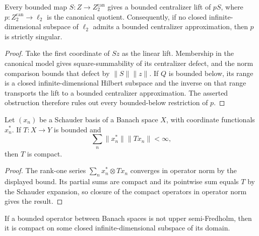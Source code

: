 \begin{lemma}
\label{lem:canonical-quotient-strictly-singular-reduction}
Every bounded map $S:Z\to Z_2^{\mathrm{can}}$ gives a bounded centralizer lift of $pS$, where
$p:Z_2^{\mathrm{can}}\to\ell_2$ is the canonical quotient.  Consequently, if no closed
infinite-dimensional subspace of $\ell_2$ admits a bounded centralizer approximation, then $p$
is strictly singular.
\leanok
\end{lemma}

\begin{proof}
Take the first coordinate of $Sz$ as the linear lift.  Membership in the canonical model gives
square-summability of its centralizer defect, and the norm comparison bounds that defect by
$\lVert S\rVert\lVert z\rVert$.  If $Q$ is bounded below, its range is a closed
infinite-dimensional Hilbert subspace and the inverse on that range transports the lift to a
bounded centralizer approximation.  The asserted obstruction therefore rules out every
bounded-below restriction of $p$.
\end{proof}

\begin{lemma}
\label{lem:schauder-weighted-images-compact}
Let $(x_n)$ be a Schauder basis of a Banach space $X$, with coordinate functionals $x_n^*$.
If $T:X\to Y$ is bounded and
\[
  \sum_n \lVert x_n^*\rVert\lVert Tx_n\rVert<\infty,
\]
then $T$ is compact.
\leanok
\end{lemma}

\begin{proof}
The rank-one series $\sum_n x_n^*\otimes Tx_n$ converges in operator norm by the displayed
bound.  Its partial sums are compact and its pointwise sum equals $T$ by the Schauder expansion,
so closure of the compact operators in operator norm gives the result.
\end{proof}

\begin{lemma}
\label{lem:basic-sequence-compact-restriction}
If a bounded operator between Banach spaces is not upper semi-Fredholm, then it is compact on
some closed infinite-dimensional subspace of its domain.
\leanok
\end{lemma}

